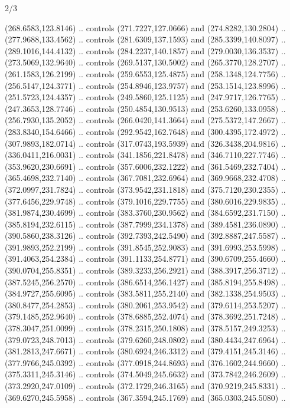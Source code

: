 \begin{flagdescription}{2/3}
\begin{scope}[xshift=0.5\flaglength,yshift=0.5\flagwidth,scale=\flagwidth/562]
\begin{scope}[y=1pt, x=1pt, yscale=-1,shift={(-421.88,-281.25)}]
  (268.6583,123.8146) .. controls (271.7227,127.0666) and (274.8282,130.2804) ..
  (277.9688,133.4562) .. controls (281.6309,137.1593) and (285.3399,140.8097) ..
  (289.1016,144.4132) .. controls (284.2237,140.1857) and (279.0030,136.3537) ..
  (273.5069,132.9640) .. controls (269.5137,130.5002) and (265.3770,128.2707) ..
  (261.1583,126.2199) .. controls (259.6553,125.4875) and (258.1348,124.7756) ..
  (256.5147,124.3771) .. controls (254.8946,123.9757) and (253.1514,123.8996) ..
  (251.5723,124.4357) .. controls (249.5860,125.1125) and (247.9717,126.7765) ..
  (247.3653,128.7746) .. controls (250.4854,130.9513) and (253.6260,133.0958) ..
  (256.7930,135.2052) .. controls (266.0420,141.3664) and (275.5372,147.2667) ..
  (283.8340,154.6466) .. controls (292.9542,162.7648) and (300.4395,172.4972) ..
  (307.9893,182.0714) .. controls (317.0743,193.5939) and (326.3438,204.9816) ..
  (336.0411,216.0031) .. controls (341.1856,221.8478) and (346.7110,227.7746) ..
  (353.9620,230.6691) .. controls (357.6006,232.1222) and (361.5469,232.7404) ..
  (365.4698,232.7140) .. controls (367.7081,232.6964) and (369.9668,232.4708) ..
  (372.0997,231.7824) .. controls (373.9542,231.1818) and (375.7120,230.2355) ..
  (377.6456,229.9748) .. controls (379.1016,229.7755) and (380.6016,229.9835) ..
  (381.9874,230.4699) .. controls (383.3760,230.9562) and (384.6592,231.7150) ..
  (385.8194,232.6115) .. controls (387.7999,234.1378) and (389.4581,236.0890) ..
  (390.5860,238.3126) .. controls (392.7393,242.5490) and (392.8887,247.5587) ..
  (391.9893,252.2199) .. controls (391.8545,252.9083) and (391.6993,253.5998) ..
  (391.4063,254.2384) .. controls (391.1133,254.8771) and (390.6709,255.4660) ..
  (390.0704,255.8351) .. controls (389.3233,256.2921) and (388.3917,256.3712) ..
  (387.5245,256.2570) .. controls (386.6514,256.1427) and (385.8194,255.8498) ..
  (384.9727,255.6095) .. controls (383.5811,255.2140) and (382.1338,254.9503) ..
  (380.8477,254.2853) .. controls (380.2061,253.9542) and (379.6114,253.5207) ..
  (379.1485,252.9640) .. controls (378.6885,252.4074) and (378.3692,251.7248) ..
  (378.3047,251.0099) .. controls (378.2315,250.1808) and (378.5157,249.3253) ..
  (379.0723,248.7013) .. controls (379.6260,248.0802) and (380.4434,247.6964) ..
  (381.2813,247.6671) .. controls (380.6924,246.3312) and (379.4151,245.3146) ..
  (377.9766,245.0392) .. controls (377.0918,244.8693) and (376.1602,244.9660) ..
  (375.3311,245.3146) .. controls (374.5049,245.6632) and (373.7842,246.2609) ..
  (373.2920,247.0109) .. controls (372.1729,246.3165) and (370.9219,245.8331) ..
  (369.6270,245.5958) .. controls (367.3594,245.1769) and (365.0303,245.5080) ..

\end{scope}
\end{scope}
\end{flagdescription}
